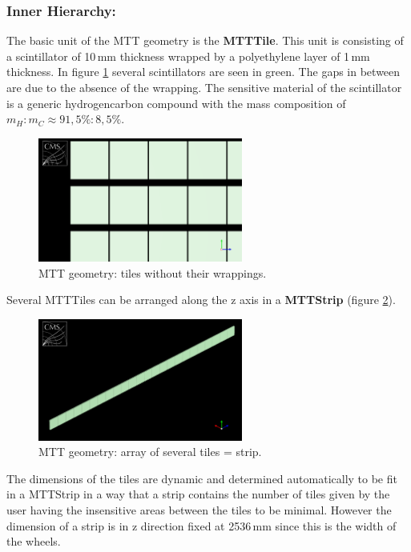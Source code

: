 			\subsubsection*{Inner Hierarchy:}
			The basic unit of the MTT geometry is the \textbf{MTTTile}.
			This unit is consisting of a scintillator of 10\,mm thickness wrapped by a polyethylene layer of 1\,mm thickness.
			In figure \ref{fig:tile_wowrapping} several scintillators are seen in green.
			The gaps in between are due to the absence of the wrapping.
			The sensitive material of the scintillator is a generic hydrogencarbon compound with the mass composition of $m_H:m_C \approx 91,5\%:8,5\%$.
			\begin{figure}[htbp]
				\centering
				\includegraphics[width=0.6\textwidth]{Figures/erdogan/tile_wowrapping.png}
				\caption{MTT geometry: tiles without their wrappings.}
				\label{fig:tile_wowrapping}
			\end{figure}
			Several MTTTiles can be arranged along the z axis in a \textbf{MTTStrip} (figure \ref{fig:strip}).
			\begin{figure}[htbp]
				\centering
				\includegraphics[width=0.6\textwidth]{Figures/erdogan/strip.png}
				\caption{MTT geometry: array of several tiles = strip.}
				\label{fig:strip}
			\end{figure}
			The dimensions of the tiles are dynamic and determined automatically to be fit in a MTTStrip in a way that a strip contains the number of tiles given by the user having the insensitive areas
			between the tiles to be minimal.
			However the dimension of a strip is in z direction fixed at 2536\,mm since this is the width of the wheels. 
